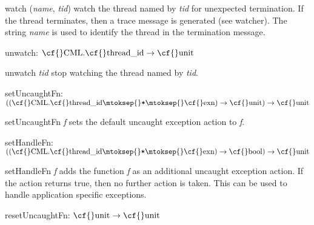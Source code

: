 \begin{descr}
\begin{speccomment}
\item {\cf \small watch (\mbox{\cf \small \textit{name}}, \mbox{\cf \small \textit{tid}})           } 
watch the thread named by \mbox{\cf \small \textit{tid}} for unexpected termination. 	  If the thread terminates, then a trace message is generated 	  (see {\cf \small watcher}). 	  The string \mbox{\cf \small \textit{name}} is used to identify the thread in the 	  termination message.     \end{speccomment}
\item {}{} {\cf unwatch: \(\mbox{\cf{}CML}.\mbox{\cf{}thread\_id}\rightarrow \mbox{\cf{}unit}\)}\label{val-TRACE_CML.unwatch}


\begin{speccomment}
\item {\cf \small unwatch \mbox{\cf \small \textit{tid}}           } 
stop watching the thread named by \mbox{\cf \small \textit{tid}}.     \end{speccomment}
\item {}{} {\cf setUncaughtFn: \(((\mbox{\cf{}CML}.\mbox{\cf{}thread\_id}\mtoksep{}\verb,*,\mtoksep{}\mbox{\cf{}exn})\rightarrow \mbox{\cf{}unit})\rightarrow \mbox{\cf{}unit}\)}\label{val-TRACE_CML.setUncaughtFn}


\begin{speccomment}
\item {\cf \small set\-Uncaught\-Fn \mbox{\cf \small \textit{f}}           } 
sets the default uncaught exception action to \mbox{\cf \small \textit{f}}.     \end{speccomment}
\item {}{} {\cf setHandleFn: \(((\mbox{\cf{}CML}.\mbox{\cf{}thread\_id}\mtoksep{}\verb,*,\mtoksep{}\mbox{\cf{}exn})\rightarrow \mbox{\cf{}bool})\rightarrow \mbox{\cf{}unit}\)}\label{val-TRACE_CML.setHandleFn}


\begin{speccomment}
\item {\cf \small set\-Handle\-Fn \mbox{\cf \small \textit{f}}           } 
adds the function \mbox{\cf \small \textit{f}} as an additional uncaught exception action. 	  If the action returns {\cf \small true}, then no further action is taken. 	  This can be used to handle application specific exceptions.     \end{speccomment}
\item {}{} {\cf resetUncaughtFn: \(\mbox{\cf{}unit}\rightarrow \mbox{\cf{}unit}\)}\label{val-TRACE_CML.resetUncaughtFn}



\end{descr}
